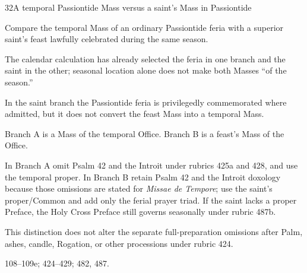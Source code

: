 \begin{casefile}{32}{A temporal Passiontide Mass versus a saint's Mass in Passiontide}
\item[Calendar facts] Compare the temporal Mass of an ordinary Passiontide feria with a superior saint's feast lawfully celebrated during the same season.
\item[Ranks and rows] The calendar calculation has already selected the feria in one branch and the saint in the other; seasonal location alone does not make both Masses “of the season.”
\item[Impeded item] In the saint branch the Passiontide feria is privilegedly commemorated where admitted, but it does not convert the feast Mass into a temporal Mass.
\item[Mass category] Branch A is a Mass of the temporal Office.  Branch B is a feast's Mass of the Office.
\item[Assembly] In Branch A omit Psalm 42 and the Introit  under rubrics 425a and 428, and use the temporal proper.  In Branch B retain Psalm 42 and the Introit doxology because those omissions are stated for \emph{Missae de Tempore}; use the saint's proper/Common and add only the ferial prayer triad.  If the saint lacks a proper Preface, the Holy Cross Preface still governs seasonally under rubric 487b.
\item[Boundary] This distinction does not alter the separate full-preparation omissions after Palm, ashes, candle, Rogation, or other processions under rubric 424.
\item[Rubric locus] 108--109e; 424--429; 482, 487.
\end{casefile}

